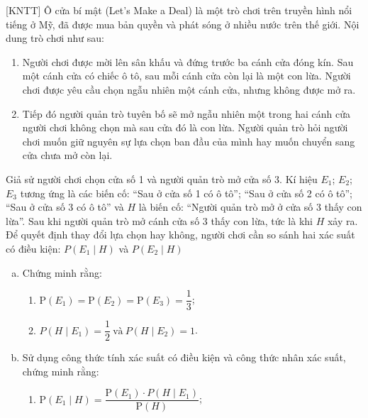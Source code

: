 \begin{bt}%
[KNTT]%
	Ô cửa bí mật (Let's Make a Deal) là một trò chơi trên truyền hình nổi tiếng ở Mỹ, đã được mua bản quyền và phát sóng ở nhiều nước trên thế giới. Nội dung trò chơi như sau:
	\begin{enumerate}[$\bullet$]
		\item Người chơi được mời lên sân khấu và đứng trước ba cánh cửa đóng kín. Sau một cánh cửa có chiếc ô tô, sau mỗi cánh cửa còn lại là một con lừa. Người chơi được yêu cầu chọn ngẫu nhiên một cánh cửa, nhưng không được mở ra.
		\item Tiếp đó người quản trò tuyên bố sẽ mở ngẫu nhiên một trong hai cánh cửa người chơi không chọn mà sau cửa đó là con lừa. Người quản trò hỏi người chơi muốn giữ nguyên sự lựa chọn ban đầu của mình hay muốn chuyển sang cửa chưa mở còn lại.
	\end{enumerate}
	Giả sử người chơi chọn cửa số 1 và người quản trò mở cửa số 3. Kí hiệu $E_1$; $E_2$; $E_3$ tương ứng là các biến cố: ``Sau ở cửa số 1 có ô tô''; ``Sau ở cửa số 2 có ô tô''; ``Sau ở cửa số 3 có ô tô'' và $H$ là biến cố: ``Người quản trò mở ở cửa số 3 thấy con lừa''.
	Sau khi người quản trò mở cánh cửa số 3 thấy con lừa, tức là khi $H$ xảy ra. Để quyết định thay đổi lựa chọn hay không, người chơi cần so sánh hai xác suất có điều kiện: $P\left(E_1\mid H\right)$ và $P\left(E_2\mid H\right)$
	\begin{enumerate}[a)]
		\item Chứng minh rằng:
		\begin{enumerate}[$\bullet$]
			\item $\mathrm{P}(E_1)=\mathrm{P}(E_2)=\mathrm{P}(E_3)=\dfrac{1}{3}$;
			\item $P\left(H \mid E_1\right)=\dfrac{1}{2} ~\text{và}~P\left(H \mid E_2\right)=1$.
		\end{enumerate}
		\item Sử dụng công thức tính xác suất có điều kiện và công thức nhân xác suất, chứng minh rằng:
		\begin{enumerate}[$\bullet$]
			\item $ \mathrm{P}\left(E_1 \mid H\right)=\dfrac{\mathrm{P}(E_1) \cdot P\left(H \mid E_1\right)}{\mathrm{P}(H)}$;

\end{enumerate}
\end{enumerate}
\end{bt}
